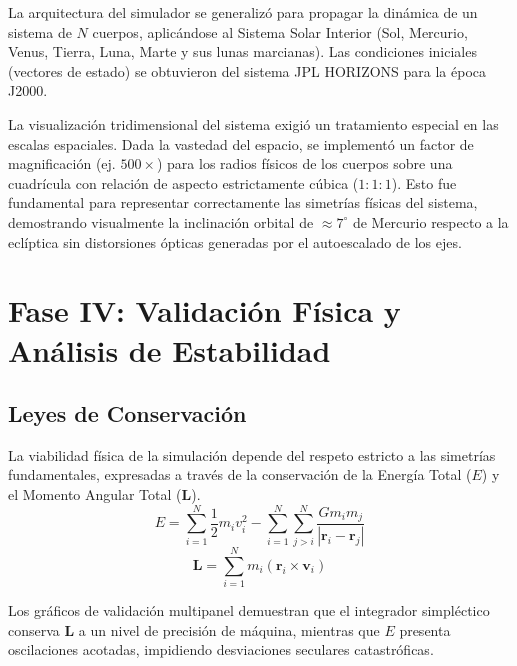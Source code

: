 \documentclass[11pt, a4paper]{article}
\begin{document}
	La arquitectura del simulador se generalizó para propagar la dinámica de un sistema de $N$ cuerpos, aplicándose al Sistema Solar Interior (Sol, Mercurio, Venus, Tierra, Luna, Marte y sus lunas marcianas). Las condiciones iniciales (vectores de estado) se obtuvieron del sistema JPL HORIZONS para la época J2000.
	
	La visualización tridimensional del sistema exigió un tratamiento especial en las escalas espaciales. Dada la vastedad del espacio, se implementó un factor de magnificación (ej. $500\times$) para los radios físicos de los cuerpos sobre una cuadrícula con relación de aspecto estrictamente cúbica ($1:1:1$). Esto fue fundamental para representar correctamente las simetrías físicas del sistema, demostrando visualmente la inclinación orbital de $\approx 7^\circ$ de Mercurio respecto a la eclíptica sin distorsiones ópticas generadas por el autoescalado de los ejes.
	
	
	\section{Fase IV: Validación Física y Análisis de Estabilidad}
	
	\subsection{Leyes de Conservación}
	La viabilidad física de la simulación depende del respeto estricto a las simetrías fundamentales, expresadas a través de la conservación de la Energía Total ($E$) y el Momento Angular Total ($\mathbf{L}$).
	$$ E = \sum_{i=1}^{N} \frac{1}{2} m_i v_i^2 - \sum_{i=1}^{N} \sum_{j > i}^{N} \frac{G m_i m_j}{|\mathbf{r}_i - \mathbf{r}_j|} $$
	$$ \mathbf{L} = \sum_{i=1}^{N} m_i (\mathbf{r}_i \times \mathbf{v}_i) $$
	
	Los gráficos de validación multipanel demuestran que el integrador simpléctico conserva $\mathbf{L}$ a un nivel de precisión de máquina, mientras que $E$ presenta oscilaciones acotadas, impidiendo desviaciones seculares catastróficas.
	
\end{document}
